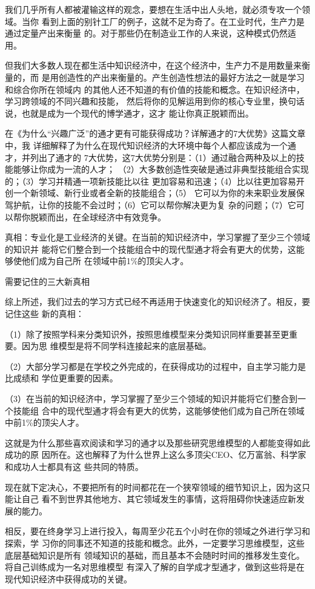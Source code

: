 \documentclass[11pt]{ctexart}
\begin{document}
{{{{我们几乎所有人都被灌输这样的观念，要想在生活中出人头地，就必须专攻一个领域。当你
看到上面的别针工厂的例子，这就不足为奇了。在工业时代，生产力是通过定量产出来衡量
的。对于那些仍在制造业工作的人来说，这种模式仍然适用。

但我们大多数人现在都生活中知识经济中，在这个经济中，生产力不是用数量来衡量的，而
是用创造性的产出来衡量的。产生创造性想法的最好方法之一就是学习和综合你所在领域内
的其他人还不知道的有价值的技能和概念。在知识经济中，学习跨领域的不同兴趣和技能，
然后将你的见解运用到你的核心专业里，换句话说，也就是成为一个现代的博学通才，这才
能让你真正脱颖而出。

在《为什么“兴趣广泛”的通才更有可能获得成功？详解通才的7大优势》这篇文章中，我
详细解释了为什么在现代知识经济的大环境中每个人都应该成为一个通才，并列出了通才的
7大优势，这7大优势分别是：（1）通过融合两种及以上的技能能够让你成为一流的人才；
（2）大多数创造性突破是通过非典型技能组合实现的；（3）学习并精通一项新技能比以往
更加容易和迅速；（4）比以往更加容易开创一个新领域、新行业或者全新的技能组合；（5）
它可以为你的未来职业发展保驾护航，让你的技能不会过时；（6）它可以帮你解决更为复
杂的问题；（7）它可以帮你脱颖而出，在全球经济中有效竞争。

真相：专业化是工业经济的关键。在当前的知识经济中，学习掌握了至少三个领域的知识并
能将它们整合到一个技能组合中的现代型通才将会有更大的优势，这能够使他们成为自己所
在领域中前1\%的顶尖人才。

需要记住的三大新真相

综上所述，我们过去的学习方式已经不再适用于快速变化的知识经济了。相反，要记住这些
新的真相：

（1）除了按照学科来分类知识外，按照思维模型来分类知识同样重要甚至更重要。因为思
维模型是将不同学科连接起来的底层基础。

（2）大部分学习都是在学校之外完成的，在获得成功的过程中，自主学习能力是比成绩和
学位更重要的因素。

（3）在当前的知识经济中，学习掌握了至少三个领域的知识并能将它们整合到一个技能组
合中的现代型通才将会有更大的优势，这能够使他们成为自己所在领域中前1\%的顶尖人才。

这就是为什么那些喜欢阅读和学习的通才以及那些研究思维模型的人都能变得如此成功的原
因所在。这也解释了为什么世界上这么多顶尖CEO、亿万富翁、科学家和成功人士都具有这
些共同的特质。

现在就下定决心，不要把所有的时间都花在一个狭窄领域的细节知识上，因为这只能让自己
看不到世界其他地方、其它领域发生的事情，这将阻碍你快速适应新发展的能力。

﻿相反，要在终身学习上进行投入，每周至少花五个小时在你的领域之外进行学习和探索，学
习你的同事还不知道的技能和概念。此外，一定要学习思维模型，这些底层基础知识是所有
领域知识的基础，而且基本不会随时时间的推移发生变化。将自己训练成为一名对思维模型
有深入了解的自学成才型通才，做到这些将是在现代知识经济中获得成功的关键。

}}}}
\end{document}
